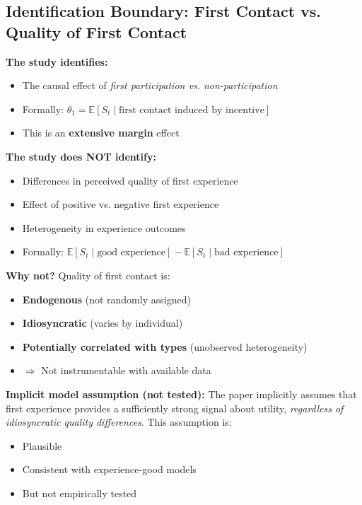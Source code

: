 \subsection{Identification Boundary: First Contact vs. Quality of First Contact}

\begin{tcolorbox}[colback=red!5!white, colframe=red!75!black,
    title=Critical Limitation: What the Study Does NOT Identify]

\textbf{The study identifies:}
\begin{itemize}[nosep]
\item The causal effect of \textit{first participation vs. non-participation}
\item Formally: $\theta_1 = \mathbb{E}[S_t \mid \text{first contact induced by incentive}]$
\item This is an \textbf{extensive margin} effect
\end{itemize}

\textbf{The study does NOT identify:}
\begin{itemize}[nosep]
\item Differences in perceived quality of first experience
\item Effect of positive vs. negative first experience
\item Heterogeneity in experience outcomes
\item Formally: $\mathbb{E}[S_t \mid \text{good experience}] - \mathbb{E}[S_t \mid \text{bad experience}]$
\end{itemize}

\textbf{Why not?} Quality of first contact is:
\begin{itemize}[nosep]
\item \textbf{Endogenous} (not randomly assigned)
\item \textbf{Idiosyncratic} (varies by individual)
\item \textbf{Potentially correlated with types} (unobserved heterogeneity)
\item $\Rightarrow$ Not instrumentable with available data
\end{itemize}

\end{tcolorbox}

\textbf{Implicit model assumption (not tested):}
The paper implicitly assumes that first experience provides a sufficiently strong signal
about utility, \textit{regardless of idiosyncratic quality differences}. This assumption is:
\begin{itemize}[nosep]
\item Plausible
\item Consistent with experience-good models
\item But not empirically tested
\end{itemize}

